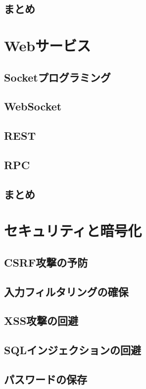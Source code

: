 \subsection{まとめ}


\section{Webサービス}

\subsection{Socketプログラミング}

\subsection{WebSocket}

\subsection{REST}

\subsection{RPC}

\subsection{まとめ}


\section{セキュリティと暗号化}

\subsection{CSRF攻撃の予防}

\subsection{入力フィルタリングの確保}

\subsection{XSS攻撃の回避}

\subsection{SQLインジェクションの回避}

\subsection{パスワードの保存}

